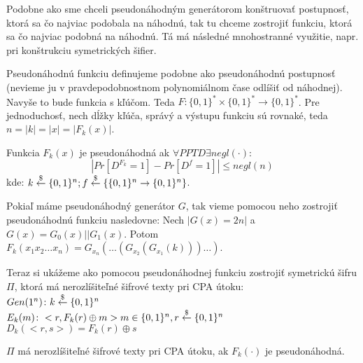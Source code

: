 Podobne ako sme chceli pseudonáhodným generátorom konštruovať
postupnosť, ktorá sa čo najviac podobala na náhodnú, tak tu
chceme zostrojiť funkciu, ktorá sa čo najviac podobná na náhodnú. 
Tá má následné mnohostranné využitie, napr. pri konštrukciu symetrických šifier.

Pseudonáhodnú funkciu definujeme podobne ako pseudonáhodnú postupnosť (nevieme ju
v pravdepodobnostnom polynomiálnom čase odlíšiť od náhodnej). 
Navyše to bude funkcia s kľúčom. 
Teda $F: \{0,1\}^* \times \{0,1\}^* \to \{0,1\}^*$. Pre jednoduchosť, nech dĺžky
kľúča, správý a výstupu funkciu sú rovnaké, teda $n = |k| = |x| = |F_k(x)|$.

\begin{definicia}
Funkcia $F_k(x)$ je pseudonáhodná ak $\forall PPT D \exists negl(\cdot)\colon$
$$|Pr[D^{F_k} = 1] - Pr[D^f = 1]| \leq negl(n)$$
kde: $k \overset{\$}{\leftarrow} \{0,1\}^n; f \overset{\$}{\leftarrow} \{ \{0,1\}^n \to \{0,1\}^n\}$.
\end{definicia}

Pokiaľ máme pseudonáhodný generátor $G$, tak vieme pomocou neho zostrojiť pseudonáhodnú
funkciu nasledovne:
Nech $|G(x)=2n|$ a $G(x) = G_0(x)||G_1(x)$. Potom $F_k(x_1 x_2 \dots x_n) = G_{x_n}(\dots(G_{x_2}(G_{x_1}(k)))\dots)$.

Teraz si ukážeme ako pomocou pseudonáhodnej funkciu zostrojiť symetrickú šifru $\Pi$, ktorá má nerozlíšiteľné
šifrové texty pri CPA útoku:\\
$Gen(1^n)\colon k \overset{\$}{\leftarrow} \{0,1\}^n$\\
$E_k(m)\colon <r, F_k(r) \oplus m> m \in \{0,1\}^n, r \overset{\$}{\leftarrow} \{0,1\}^n$\\
$D_k(<r,s>) = F_k(r) \oplus s$

\begin{veta}
$\Pi$ má nerozlíšiteľné šifrové texty pri CPA útoku, ak $F_k(\cdot)$ je pseudonáhodná.
\end{veta}

